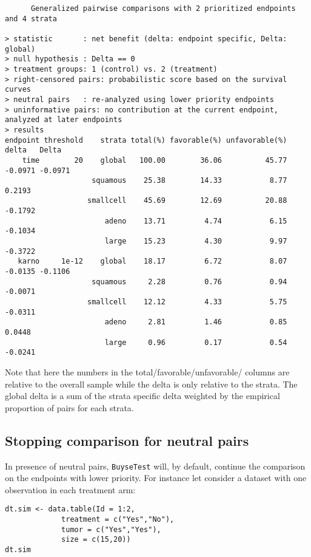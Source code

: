 \documentclass[12pt]{article}
\begin{document}
\begin{verbatim}
      Generalized pairwise comparisons with 2 prioritized endpoints and 4 strata

> statistic       : net benefit (delta: endpoint specific, Delta: global) 
> null hypothesis : Delta == 0 
> treatment groups: 1 (control) vs. 2 (treatment) 
> right-censored pairs: probabilistic score based on the survival curves
> neutral pairs   : re-analyzed using lower priority endpoints
> uninformative pairs: no contribution at the current endpoint, analyzed at later endpoints
> results
endpoint threshold    strata total(%) favorable(%) unfavorable(%)   delta   Delta
    time        20    global   100.00        36.06          45.77 -0.0971 -0.0971
                    squamous    25.38        14.33           8.77  0.2193        
                   smallcell    45.69        12.69          20.88 -0.1792        
                       adeno    13.71         4.74           6.15 -0.1034        
                       large    15.23         4.30           9.97 -0.3722        
   karno     1e-12    global    18.17         6.72           8.07 -0.0135 -0.1106
                    squamous     2.28         0.76           0.94 -0.0071        
                   smallcell    12.12         4.33           5.75 -0.0311        
                       adeno     2.81         1.46           0.85  0.0448        
                       large     0.96         0.17           0.54 -0.0241
\end{verbatim}

Note that here the numbers in the total/favorable/unfavorable/ columns
are relative to the overall sample while the delta is only relative to
the strata. The global delta is a sum of the strata specific delta
weighted by the empirical proportion of pairs for each strata.

\subsection{Stopping comparison for neutral pairs}
\label{sec:org4f48be0}
In presence of neutral pairs, \texttt{BuyseTest} will, by default, continue
the comparison on the endpoints with lower priority. For instance let
consider a dataset with one observation in each treatment arm:
\lstset{language=r,label= ,caption= ,captionpos=b,numbers=none}
\begin{lstlisting}
dt.sim <- data.table(Id = 1:2,
		     treatment = c("Yes","No"),
		     tumor = c("Yes","Yes"),
		     size = c(15,20))
dt.sim
\end{lstlisting}
\end{document}
